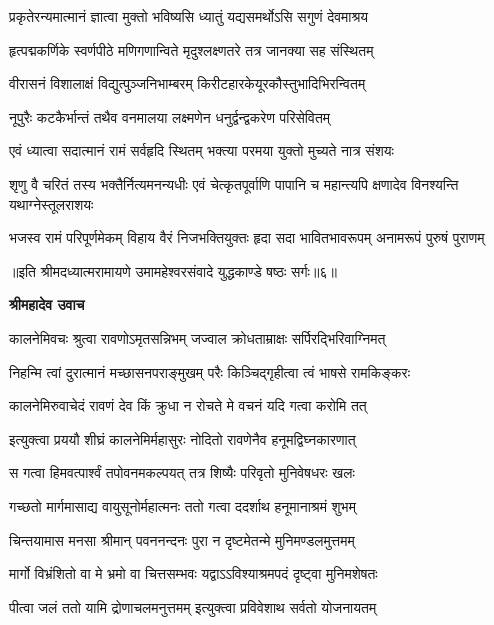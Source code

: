 \twolineshloka
{प्रकृतेरन्यमात्मानं ज्ञात्वा मुक्तो भविष्यसि}
{ध्यातुं यद्यसमर्थोऽसि सगुणं देवमाश्रय} %

\twolineshloka
{हृत्पद्मकर्णिके स्वर्णपीठे मणिगणान्विते}
{मृदुश्लक्ष्णतरे तत्र जानक्या सह संस्थितम्} %

\twolineshloka
{वीरासनं विशालाक्षं विद्युत्पुञ्जनिभाम्बरम्}
{किरीटहारकेयूरकौस्तुभादिभिरन्वितम्} %

\twolineshloka
{नूपुरैः कटकैर्भान्तं तथैव वनमालया}
{लक्ष्मणेन धनुर्द्वन्द्वकरेण परिसेवितम्} %

\twolineshloka
{एवं ध्यात्वा सदात्मानं रामं सर्वहृदि स्थितम्}
{भक्त्या परमया युक्तो मुच्यते नात्र संशयः} %

\threelineshloka
{शृणु वै चरितं तस्य भक्तैर्नित्यमनन्यधीः}
{एवं चेत्कृतपूर्वाणि पापानि च महान्त्यपि}
{क्षणादेव विनश्यन्ति यथाग्नेस्तूलराशयः} %

\fourlineindentedshloka
{भजस्व रामं परिपूर्णमेकम्}
{विहाय वैरं निजभक्तियुक्तः}
{हृदा सदा भावितभावरूपम्}
{अनामरूपं पुरुषं पुराणम्} %

{॥इति श्रीमदध्यात्मरामायणे उमामहेश्वरसंवादे युद्धकाण्डे षष्ठः
सर्गः॥६॥
}




\textbf{श्रीमहादेव उवाच}

\twolineshloka
{कालनेमिवचः श्रुत्वा रावणोऽमृतसन्निभम्}
{जज्वाल क्रोधताम्राक्षः सर्पिरद्भिरिवाग्निमत्} %

\twolineshloka
{निहन्मि त्वां दुरात्मानं मच्छासनपराङ्मुखम्}
{परैः किञ्चिद्गृहीत्वा त्वं भाषसे रामकिङ्करः} %

\twolineshloka
{कालनेमिरुवाचेदं रावणं देव किं क्रुधा}
{न रोचते मे वचनं यदि गत्वा करोमि तत्} %

\twolineshloka
{इत्युक्त्वा प्रययौ शीघ्रं कालनेमिर्महासुरः}
{नोदितो रावणेनैव हनूमद्विघ्नकारणात्} %

\twolineshloka
{स गत्वा हिमवत्पार्श्वं तपोवनमकल्पयत्}
{तत्र शिष्यैः परिवृतो मुनिवेषधरः खलः} %

\twolineshloka
{गच्छतो मार्गमासाद्य वायुसूनोर्महात्मनः}
{ततो गत्वा ददर्शाथ हनूमानाश्रमं शुभम्} %

\twolineshloka
{चिन्तयामास मनसा श्रीमान् पवननन्दनः}
{पुरा न दृष्टमेतन्मे मुनिमण्डलमुत्तमम्} %

\twolineshloka
{मार्गो विभ्रंशितो वा मे भ्रमो वा चित्तसम्भवः}
{यद्वाऽऽविश्याश्रमपदं दृष्ट्वा मुनिमशेषतः} %

\twolineshloka
{पीत्वा जलं ततो यामि द्रोणाचलमनुत्तमम्}
{इत्युक्त्वा प्रविवेशाथ सर्वतो योजनायतम्} %

